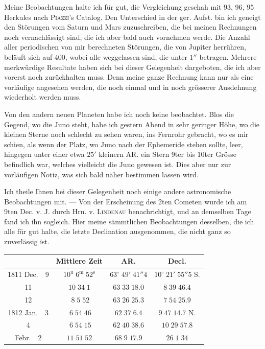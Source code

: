 \par\indent Meine Beobachtungen halte ich für gut, die Vergleichung geschah mit 93, 96, 95 Herkules nach \textsc{Piazzi}'s Catalog. Den Unterschied in der ger. Aufst. bin ich geneigt den Störungen vom Saturn und Mars zuzuschreiben, die bei meinen Rechnungen noch vernachlässigt sind, die ich aber bald auch vornehmen werde. Die Anzahl aller periodischen von mir berechneten Störungen, die von Jupiter herrühren, beläuft sich auf 400, wobei alle weggelassen sind, die unter $1''$ betragen. Mehrere merkwürdige Resultate haben sich bei dieser Gelegenheit dargeboten, die ich aber vorerst noch zurückhalten muss. Denn meine ganze Rechnung kann nur als eine vorläufige angesehen werden, die noch einmal und in noch grösserer Ausdehnung wiederholt werden muss.

\par\indent Von den andern neuen Planeten habe ich noch keine beobachtet. Blos die Gegend, wo die Juno steht, habe ich gestern Abend in sehr geringer Höhe, wo die kleinen Sterne noch schlecht zu sehen waren, ins Fernrohr gebracht, wo es mir schien, als wenn der Platz, wo Juno nach der Ephemeride stehen sollte, leer, hingegen unter einer etwa $25'$ kleinern AR. ein Stern 9ter bis 10ter Grösse befindlich war, welches vielleicht die Juno gewesen ist. Dies aber nur zur vorläufigen Notiz, was sich bald näher bestimmen lassen wird.

\par\indent Ich theile Ihnen bei dieser Gelegenheit noch einige andere astronomische Beobachtungen mit. — Von der Erscheinung des 2ten Cometen wurde ich am 9ten Dec. v. J. durch Hrn. v. \textsc{Lindenau} benachrichtigt, und an demselben Tage fand ich ihn sogleich. Hier meine sämmtlichen Beobachtungen desselben, die ich alle für gut halte, die letzte Declination ausgenommen, die nicht ganz so zuverlässig ist.

\begin{center}
\fontsize{10}{12}\selectfont\setlength{\tabcolsep}{3pt}\renewcommand{\arraystretch}{1.15}\begin{tabular}{c|c|c|c}
 & Mittlere Zeit & AR. & Decl. \\
\hline
1811 Dec.\ \ 9 & $10^{\mathrm u}\;6^{\mathrm m}\;52^{\mathrm s}$ & $63^\circ\;49'\;41''4$ & $10^\circ\;21'\;55''5$ S. \\
11 & $10\;34\;1$ & $63\;33\;18.0$ & $8\;39\;46.4$ \\
12 & $\;8\;5\;52$ & $63\;26\;25.3$ & $7\;54\;25.9$ \\
1812 Jan.\ \ 3 & $\;6\;54\;46$ & $62\;37\;6.4$ & $9\;47\;14.7$ N. \\
4 & $\;6\;54\;15$ & $62\;40\;38.6$ & $10\;29\;57.8$ \\
Febr.\ \ 2 & $11\;51\;52$ & $68\;9\;17.9$ & $26\;1\;34$ \\
\end{tabular}
\end{center}

